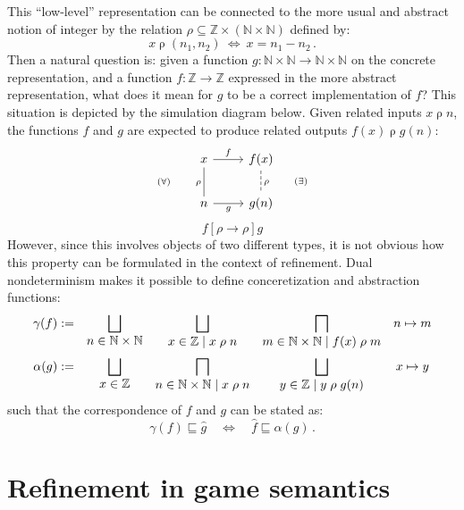 \documentclass[11pt,oneside,draft]{book}
\theoremstyle{definition}
\newcommand{\ifr}[1]{\mathrel{[{#1}]}}
\newcommand{\refby}{\sqsubseteq} %
\begin{document}
This ``low-level'' representation can be connected
to the more usual and abstract notion of integer
by the relation
$\rho \subseteq \mathbb{Z} \times (\mathbb{N} \times \mathbb{N})$
defined by:
\[
  x \mathrel{\rho} (n_1, n_2)
  \: \Leftrightarrow \:
  x = n_1 - n_2
  \,.
\]
Then a natural question is:
given a function
$g : \mathbb{N} \times \mathbb{N} \rightarrow
     \mathbb{N} \times \mathbb{N}$
on the concrete representation,
and a function
$f : \mathbb{Z} \rightarrow \mathbb{Z}$
expressed in the more abstract representation,
what does it mean for $g$ to be a correct implementation of $f$?
This situation is depicted by the simulation diagram below.
Given related inputs $x \mathrel{\rho} n$,
the functions $f$ and $g$ are expected to produce
related outputs $f(x) \mathrel{\rho} g(n)$:
\[
  \begin{tikzcd}
    x \ar[r, "f"] \ar[d, "(\forall) \qquad \rho"', dash] &
    f(x) \ar[d, "\rho \qquad (\exists)", dash, dashed] \\
    n \ar[r, "g"'] &
    g(n)
  \end{tikzcd}
\]
\[
  f \ifr{\rho \rightarrow \rho} g
\]
However,
since this involves objects of two different types,
it is not obvious how this property can be formulated
in the context of refinement.
Dual nondeterminism makes it possible to define
conceretization and abstraction functions:
\[
  \begin{array}{rcccc}
    \gamma(f) := &
      \displaystyle
      \bigsqcup_{\mbox{$n \in \mathbb{N} \times \mathbb{N}$}} &
      \displaystyle
      \bigsqcup_{\mbox{$x \in \mathbb{Z} \mid x \mathrel{\rho} n$}} &
      \displaystyle
      \bigsqcap_{\mbox{$m \in \mathbb{N} \times \mathbb{N} \mid
                 f(x) \mathrel{\rho} m$}} &
      n \mapsto m
    \vspace{0.6em}
    \\
    \alpha(g) := &
      \displaystyle
      \bigsqcup_{\mbox{$x \in \mathbb{Z}$}} &
      \displaystyle
      \bigsqcap_{\mbox{$n \in \mathbb{N} \times \mathbb{N} \mid
        x \mathrel{\rho} n$}} &
      \displaystyle
      \bigsqcup_{\mbox{$y \in \mathbb{Z} \mid
        y \mathrel{\rho} g(n)$}} &
      x \mapsto y
  \end{array}
\]
such that the correspondence of $f$ and $g$ can be stated as:
\[
  \gamma(f) \sqsubseteq \hat{g}
  \quad \Leftrightarrow \quad
  \hat{f} \refby \alpha(g)
  \,.
\]



\section{Refinement in game semantics} \label{sec:refgs} %
\end{document}
